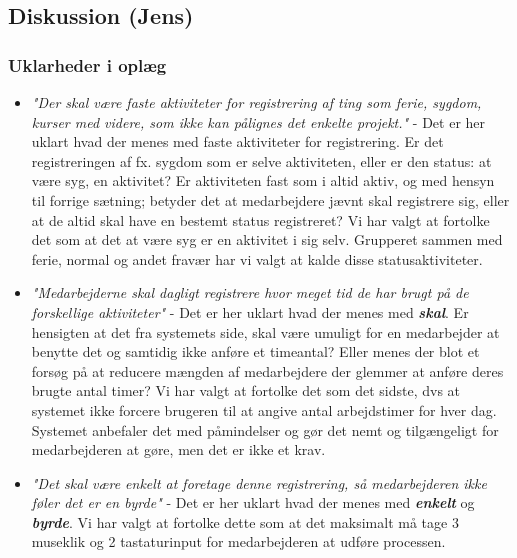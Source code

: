 \subsection{Diskussion (Jens)}

\subsubsection{Uklarheder i oplæg}
\begin{itemize}
    \item \textit{"Der skal være faste aktiviteter for registrering af ting som ferie, sygdom, kurser med videre, som ikke kan pålignes det enkelte projekt."} - Det er her uklart hvad der menes med faste aktiviteter for registrering. Er det registreringen af fx. sygdom som er selve aktiviteten, eller er den status: at være syg, en aktivitet? Er aktiviteten fast som i altid aktiv, og med hensyn til forrige sætning; betyder det at medarbejdere jævnt skal registrere sig, eller at de altid skal have en bestemt status registreret? Vi har valgt at fortolke det som at det at være syg er en aktivitet i sig selv. Grupperet sammen med ferie, normal og andet fravær har vi valgt at kalde disse statusaktiviteter. 
    
    \item \textit{"Medarbejderne skal dagligt registrere hvor meget tid de har brugt på de forskellige aktiviteter"} - Det er her uklart hvad der menes med \textit{\textbf{skal}}. Er hensigten at det fra systemets side, skal være umuligt for en medarbejder at benytte det og samtidig ikke anføre et timeantal? Eller menes der blot et forsøg på at reducere mængden af medarbejdere der glemmer at anføre deres brugte antal timer? Vi har valgt at fortolke det som det sidste, dvs at systemet ikke forcere brugeren til at angive antal arbejdstimer for hver dag. Systemet anbefaler det med påmindelser og gør det nemt og tilgængeligt for medarbejderen at gøre, men det er ikke et krav.
    
    \item \textit{"Det skal være enkelt at foretage denne registrering, så medarbejderen ikke føler det er en byrde"} - Det er her uklart hvad der menes med \textit{\textbf{enkelt}} og \textit{\textbf{byrde}}. Vi har valgt at fortolke dette som at det maksimalt må tage 3 museklik og 2 tastaturinput for medarbejderen at udføre processen. 
    
\end{itemize}


